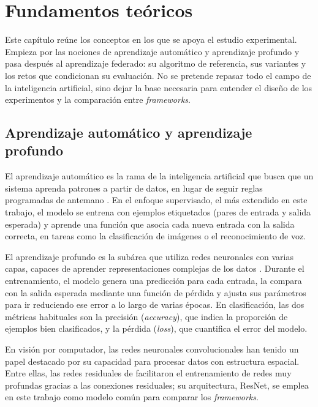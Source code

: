 \chapter{Fundamentos teóricos}\label{chap:fundamentos}

Este capítulo reúne los conceptos en los que se apoya el estudio experimental. Empieza
por las nociones de aprendizaje automático y aprendizaje profundo y pasa después al
aprendizaje federado: su algoritmo de referencia, sus variantes y los retos que
condicionan su evaluación. No se pretende repasar todo el campo de la inteligencia
artificial, sino dejar la base necesaria para entender el diseño de los experimentos y
la comparación entre \textit{frameworks}.

\section{Aprendizaje automático y aprendizaje profundo}\label{sec:ml-dl}

El aprendizaje automático es la rama de la inteligencia artificial que busca que un
sistema aprenda patrones a partir de datos, en lugar de seguir reglas programadas de
antemano \parencite{goodfellow2016deep}. En el enfoque supervisado, el más extendido en
este trabajo, el modelo se entrena con ejemplos etiquetados (pares de entrada y salida
esperada) y aprende una función que asocia cada nueva entrada con la salida correcta, en
tareas como la clasificación de imágenes o el reconocimiento de voz.

El aprendizaje profundo es la subárea que utiliza redes neuronales con varias capas,
capaces de aprender representaciones complejas de los datos \parencite{goodfellow2016deep}.
Durante el entrenamiento, el modelo genera una predicción para cada entrada, la compara
con la salida esperada mediante una función de pérdida y ajusta sus parámetros para ir
reduciendo ese error a lo largo de varias épocas. En clasificación, las dos métricas
habituales son la precisión (\textit{accuracy}), que indica la proporción de ejemplos
bien clasificados, y la pérdida (\textit{loss}), que cuantifica el error del modelo.

En visión por computador, las redes neuronales convolucionales han tenido un papel
destacado por su capacidad para procesar datos con estructura espacial. Entre ellas, las
redes residuales de \textcite{he2016deep} facilitaron el entrenamiento de redes muy
profundas gracias a las conexiones residuales; su arquitectura, ResNet, se emplea en
este trabajo como modelo común para comparar los \textit{frameworks}.

